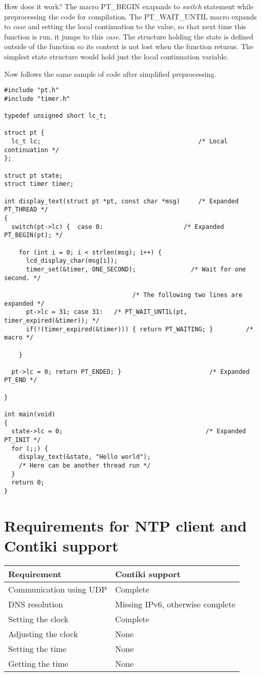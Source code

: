 How does it work? The macro PT\_BEGIN exapands to {\it switch} statement while preprocessing the
code for compilation.
The PT\_WAIT\_UNTIL macro expands to {\it case} and setting the local continuation
to the value, so that next time this function is run, it jumps to this {\it case}.
The structure holding the state is defined outside of the function so its context is not lost when
the function returns. The simplest state structure would hold just the local continuation variable.

Now follows the same sample of code after simplified preprocessing.
\begin{lstlisting}
#include "pt.h"
#include "timer.h"

typedef unsigned short lc_t;

struct pt {
  lc_t lc;                                           /* Local continuation */
}; 

struct pt state;
struct timer timer;

int display_text(struct pt *pt, const char *msg)     /* Expanded PT_THREAD */
{
  switch(pt->lc) {  case 0:                      /* Expanded PT_BEGIN(pt); */
  
    for (int i = 0; i < strlen(msg); i++) {
      lcd_display_char(msg[i]);
      timer_set(&timer, ONE_SECOND);               /* Wait for one second. */
    
                                   /* The following two lines are expanded */
      pt->lc = 31; case 31:   /* PT_WAIT_UNTIL(pt, timer_expired(&timer)); */
      if(!(timer_expired(&timer))) { return PT_WAITING; }         /* macro */
    
    }
  
  pt->lc = 0; return PT_ENDED; }                        /* Expanded PT_END */
  
}

int main(void)
{
  state->lc = 0;                                       /* Expanded PT_INIT */
  for (;;) {
    display_text(&state, "Hello world");
    /* Here can be another thread run */
  }
  return 0;
}

\end{lstlisting}

\chapter{Requirements for NTP client and Contiki support}\label{app:requirements}
\begin{tabular}{|l|l|}
	\hline
	Requirement & Contiki support \\ \hline
	Communication using UDP & Complete \\
	DNS resolution & Missing IPv6, otherwise complete \\
	Setting the clock & Complete \\
	Adjusting the clock & None \\
	Setting the time & None \\
	Getting the time & None \\
	\hline
\end{tabular}

